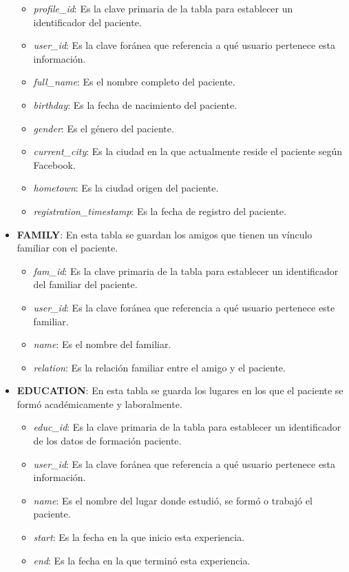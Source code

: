 \begin{itemize}
\begin{itemize}
		\item \textit{ profile\_id}: Es la clave primaria de la tabla para establecer un identificador del paciente.
		\item \textit{ user\_id}: Es la clave foránea que referencia a qué usuario pertenece esta información.
		\item \textit{ full\_name}: Es el nombre completo del paciente.
		\item \textit{ birthday}: Es la fecha de nacimiento del paciente.
		\item \textit{ gender}: Es el género del paciente.
		\item \textit{ current\_city}: Es la ciudad en la que actualmente reside el paciente según Facebook.
		\item \textit{ hometown}: Es la ciudad origen del paciente.
		\item \textit{ registration\_timestamp}: Es la fecha de registro del paciente.
	\end{itemize}
	\item \textbf{ FAMILY}: En esta tabla se guardan los amigos que tienen un vínculo familiar con el paciente.
	\begin{itemize}
		\item \textit{ fam\_id}: Es la clave primaria de la tabla para establecer un identificador del familiar del paciente.
		\item \textit{ user\_id}: Es la clave foránea que referencia a qué usuario pertenece este familiar.
		\item \textit{ name}: Es el nombre del familiar.
		\item \textit{ relation}: Es la relación familiar entre el amigo y el paciente.
	\end{itemize}
	\item \textbf{ EDUCATION}: En esta tabla se guarda los lugares en los que el paciente se formó académicamente y laboralmente.
	\begin{itemize}
		\item \textit{ educ\_id}: Es la clave primaria de la tabla para establecer un identificador de los datos de formación paciente.
		\item \textit{ user\_id}: Es la clave foránea que referencia a qué usuario pertenece esta información.
		\item \textit{ name}: Es el nombre del lugar donde estudió, se formó o trabajó el paciente.
		\item \textit{ start}: Es la fecha en la que inicio esta experiencia.
		\item \textit{ end}: Es la fecha en la que terminó esta experiencia.

\end{itemize}
\end{itemize}
